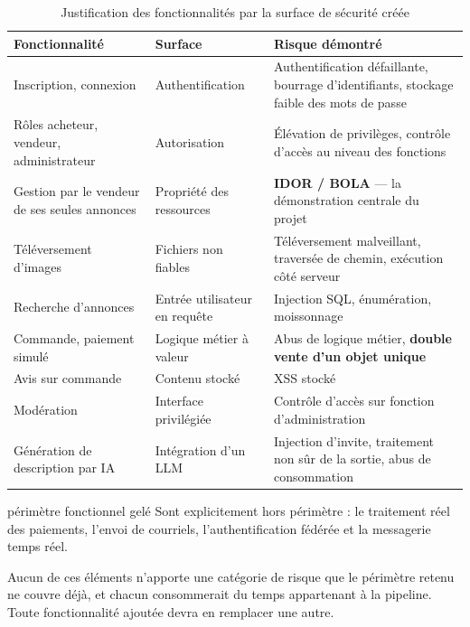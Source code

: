 \begin{table}[H]
\centering
\caption{Justification des fonctionnalités par la surface de sécurité créée}
\label{tab:surface}
\small
\begin{tabular}{@{}p{3.9cm}p{4.0cm}p{6.0cm}@{}}
\toprule
\textbf{Fonctionnalité} & \textbf{Surface} & \textbf{Risque démontré} \\
\midrule
Inscription, connexion & Authentification
& Authentification défaillante, bourrage d'identifiants, stockage faible des
mots de passe \\
\addlinespace
Rôles acheteur, vendeur, administrateur & Autorisation
& Élévation de privilèges, contrôle d'accès au niveau des fonctions \\
\addlinespace
Gestion par le vendeur de ses seules annonces & Propriété des ressources
& \textbf{IDOR / BOLA} --- la démonstration centrale du projet \\
\addlinespace
Téléversement d'images & Fichiers non fiables
& Téléversement malveillant, traversée de chemin, exécution côté serveur \\
\addlinespace
Recherche d'annonces & Entrée utilisateur en requête
& Injection SQL, énumération, moissonnage \\
\addlinespace
Commande, paiement simulé & Logique métier à valeur
& Abus de logique métier, \textbf{double vente d'un objet unique} \\
\addlinespace
Avis sur commande & Contenu stocké
& XSS stocké \\
\addlinespace
Modération & Interface privilégiée
& Contrôle d'accès sur fonction d'administration \\
\addlinespace
Génération de description par IA & Intégration d'un LLM
& Injection d'invite, traitement non sûr de la sortie, abus de consommation \\
\bottomrule
\end{tabular}
\end{table}

\begin{decision}{périmètre fonctionnel gelé}
Sont explicitement hors périmètre : le traitement réel des paiements, l'envoi de
courriels, l'authentification fédérée et la messagerie temps réel.

Aucun de ces éléments n'apporte une catégorie de risque que le périmètre retenu
ne couvre déjà, et chacun consommerait du temps appartenant à la pipeline.
Toute fonctionnalité ajoutée devra en remplacer une autre.
\end{decision}

